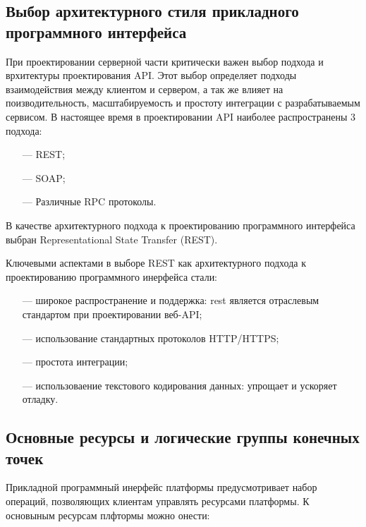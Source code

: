 \subsection{Выбор архитектурного стиля прикладного программного интерфейса}

При проектировании серверной части критически важен выбор подхода и врхитектуры проектирования API.
Этот выбор определяет подходы взаимодействия между клиентом и сервером, а так же влияет на поизводительность, масштабируемость и простоту интеграции с разрабатываемым сервисом.
В настоящее время в проектировании API наиболее распространены 3 подхода: 

\begin{itemize}
  \item[---] REST\cite{wilde2011rest};
  \item[---] SOAP\cite{box2000simple};
  \item[---] Различные RPC протоколы\cite{srinivasan1995rpc}. 
\end{itemize}

В качестве архитектурного подхода к проектированию программного интерфейса выбран Representational State Transfer (REST).

Ключевыми аспектами в выборе REST как архитектурного подхода к проектированию программного инерфейса стали:

\begin{itemize}
  \item[---] широкое распространение и поддержка: rest является отраслевым стандартом при проектировании веб-API;
  \item[---] использование стандартных протоколов HTTP/HTTPS;
  \item[---] простота интеграции;
  \item[---] использоваение текстового кодирования данных: упрощает и ускоряет отладку. 
\end{itemize}

\subsection{Основные ресурсы и логические группы конечных точек}

Прикладной программный инерфейс платформы предусмотривает набор операций, позволяющих клиентам управлять ресурсами платформы.
К основыным ресурсам плфтормы можно онести:

